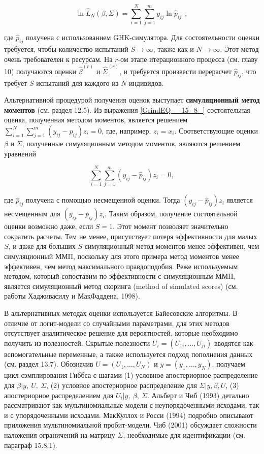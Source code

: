 \[{\ln  {\hat{L}}_N(\beta ,\Sigma )=\sum^N_{i=1}{\sum^m_{j=1}{y_{ij}{\ln  {\hat{p}}_{ij}\ }}}\ },\] 

где ${\hat{p}}_{ij}$ получена с использованием GHK-симулятора. Для состоятельности оценки требуется, чтобы количество испытаний  $S\to \infty $, также как и $N\to \infty $. Этот метод очень требователен к ресурсам. На $r$-ом этапе итерационного процесса (см. главу 10) получаются оценки ${\widehat{\beta }}^{(r)}$ и ${\widehat{\Sigma }}^{(r)}$, и требуется произвести перерасчет ${\hat{p}}_{ij}$, что требует $S$ испытаний для каждого из $N$ индивидов.

Альтернативной процедурой получения оценок выступает \textbf{симуляционный метод моментов} (см. раздел 12.5). Из выражения \eqref{GrindEQ__15_8_} состоятельная оценка, полученная методом моментов, является решением $\sum^N_{i=1}{\sum^m_{j=1}{\left(y_{ij}-p_{ij}\right)z_i=0}}$, где, например, $z_i=x_i$. Соответствующие оценки $\beta $ и $\Sigma $, полученные симуляционным методом моментов, являются решением уравнений

\[\sum^N_{i=1}{\sum^m_{j=1}{\left(y_{ij}-{\hat{p}}_{ij}\right)z_i=0}},\] 

где ${\hat{p}}_{ij}$ получена с помощью несмещенной оценки. Тогда $\left(y_{ij}-{\hat{p}}_{ij}\right)z_i$ является несмещенным для $\left(y_{ij}-p_{ij}\right)z_i$. Таким образом, получение состоятельной оценки возможно даже, если $S=1$. Этот момент позволяет значительно сократить расчеты. Тем не менее, присутствует потеря эффективности для малых $S$, и даже для больших $S$ симуляционный метод моментов менее эффективен, чем симуляционный ММП, поскольку для этого примера метод моментов менее эффективен, чем метод максимального правдоподобия. Реже используемым методом, который сопоставим по эффективности с симуляционным ММП, является симуляционный метод скоринга (method of simulated scores) (см. работы Хадживасилу и МакФаддена, 1998).

В альтернативных методах оценки используется Байесовские алгоритмы. В отличие от логит-модели со случайными параметрами, для этих методов отсутствует аналитическое решение для вероятностей, которые необходимо получить из полезностей. Скрытые полезности $U_i=(U_{1i},\dots ,U_{ji})$ вводятся как вспомогательные переменные, а также используется подход пополнения данных (см. раздел 13.7). Обозначив $U=(U_1,\dots ,U_N)$ и $y=(y_1,\dots ,y_N)$, получаем цикл сэмплирования Гиббса с шагами (1) условное апостериорное распределение для $\beta |y,\ U,\ \Sigma $, (2) условное апостериорное распределение для $\Sigma |y,\beta ,U$, (3) апостериорное распределением для $U_i|y,\ \beta ,\ \Sigma $. Альберт и Чиб (1993) детально рассматривают как мультиномиальные модели с неупорядоченными исходами, так и с упорядоченными исходами. МакКуллох и Росси (1994) подробно описывают приложения мультиномиальной пробит-модели. Чиб (2001) обсуждает сложности наложения ограничений на матрицу $\Sigma $, необходимые для идентификации (см. параграф 15.8.1).

